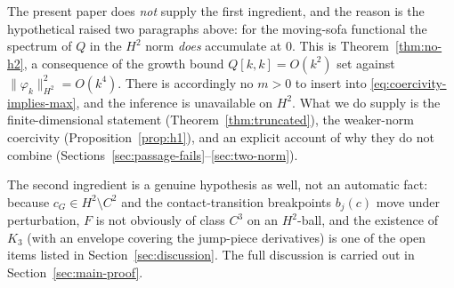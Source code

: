 \documentclass[11pt]{amsart}
\theoremstyle{plain}
\theoremstyle{definition}
\newcommand{\cG}{c_{G}}
\begin{document}
The present paper does \emph{not} supply the first ingredient, and the
reason is the hypothetical raised two paragraphs above: for the
moving-sofa functional the spectrum of $Q$ in the $H^{2}$ norm
\emph{does} accumulate at $0$.  This is Theorem~\ref{thm:no-h2}, a
consequence of the growth bound $Q[k,k] = O(k^{2})$ set against
$\|\varphi_{k}\|_{H^{2}}^{2} = O(k^{4})$.  There is accordingly no
$m>0$ to insert into \eqref{eq:coercivity-implies-max}, and the
inference is unavailable on $H^{2}$.  What we do supply is the
finite-dimensional statement (Theorem~\ref{thm:truncated}), the
weaker-norm coercivity (Proposition~\ref{prop:h1}), and an explicit
account of why they do not combine
(Sections~\ref{sec:passage-fails}--\ref{sec:two-norm}).

The second ingredient is a genuine hypothesis as well, not an
automatic fact: because $\cG\in H^{2}\setminus C^{2}$ and the
contact-transition breakpoints $b_{j}(c)$ move under perturbation,
$F$ is not obviously of class $C^{3}$ on an $H^{2}$-ball, and the
existence of $K_{3}$ (with an envelope covering the jump-piece
derivatives) is one of the open items listed in
Section~\ref{sec:discussion}.  The full discussion is carried out in
Section~\ref{sec:main-proof}.
\end{document}
